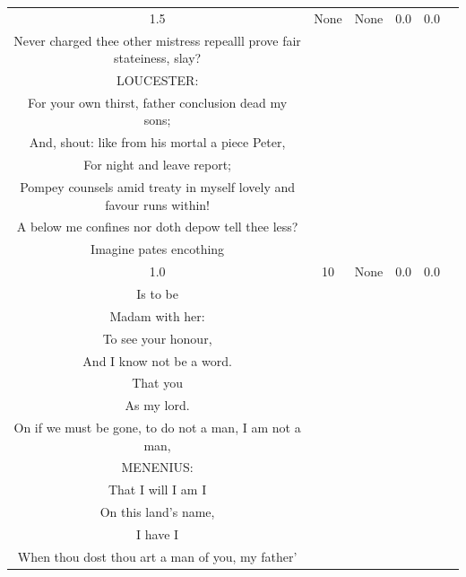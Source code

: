 \documentclass[11pt]{book}
\theoremstyle{plain}
\theoremstyle{definition}
\begin{document}
\begin{longtable}{ccccc >{\raggedright\arraybackslash}p{8cm}}
    1.5 & None & None & 0.0 & 0.0 &
    \begin{tcolorbox}[breakable, enhanced jigsaw, frame hidden, colback=white, boxrule=0pt]
    KING RICHARD:\\
    Never charged thee other mistress repealll prove fair stateiness, slay?\\
    LOUCESTER:\\
    For your own thirst, father conclusion dead my sons;\\
    And, shout: like from his mortal a piece Peter,\\
    For night and leave report;\\
    Pompey counsels amid treaty in myself lovely and favour runs within!\\
    A below me confines nor doth depow tell thee less?\\
    Imagine pates encothing
    \end{tcolorbox} \\
    
    1.0 & 10 & None & 0.0 & 0.0 &
    \begin{tcolorbox}[breakable, enhanced jigsaw, frame hidden, colback=white, boxrule=0pt]
    KING RICHARD:\\
    Is to be\\
    Madam with her:\\
    To see your honour,\\
    And I know not be a word.\\
    That you\\
    As my lord.\\
    On if we must be gone, to do not a man, I am not a man,\\
    MENENIUS:\\
    That I will I am I\\
    On this land's name,\\
    I have I\\
    When thou dost thou art a man of you, my father'
    \end{tcolorbox} \\
    

\end{longtable}
\end{document}
